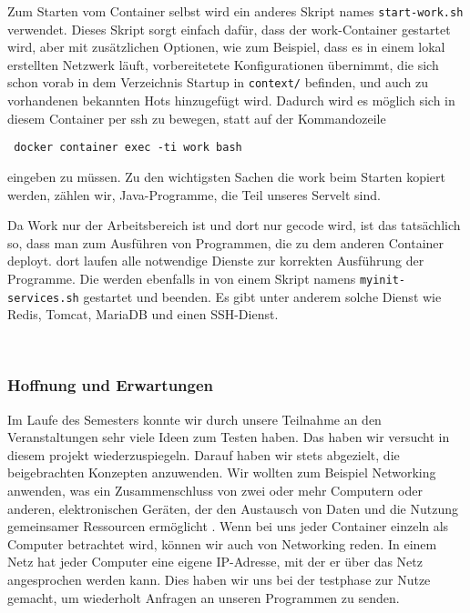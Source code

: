 Zum Starten vom Container selbst wird ein anderes Skript names \texttt{start-work.sh} verwendet. Dieses Skript sorgt einfach dafür, dass der work-Container gestartet wird, aber mit zusätzlichen Optionen, wie zum Beispiel, dass es in einem lokal erstellten Netzwerk läuft, vorbereitetete Konfigurationen übernimmt, die sich schon vorab in dem Verzeichnis Startup in \texttt{context/} befinden, und auch zu vorhandenen bekannten Hots hinzugefügt wird. Dadurch wird es möglich sich in diesem Container per ssh zu bewegen, statt auf der Kommandozeile \begin{verbatim} docker container exec -ti work bash \end{verbatim} eingeben zu müssen. Zu den wichtigsten Sachen die work beim Starten kopiert werden, zählen wir, Java-Programme, die Teil unseres Servelt sind.

Da Work nur der Arbeitsbereich ist und dort nur gecode wird, ist das tatsächlich so, dass man zum Ausführen von Programmen, die zu dem anderen Container deployt. dort laufen alle notwendige Dienste zur korrekten Ausführung der Programme. Die werden ebenfalls in von einem Skript namens \texttt{myinit-services.sh} gestartet und beenden. Es gibt unter anderem solche Dienst wie Redis, Tomcat, MariaDB und einen SSH-Dienst.

\\

\subsubsection{Hoffnung und Erwartungen}


Im Laufe des Semesters konnte wir durch unsere Teilnahme an den Veranstaltungen sehr viele Ideen zum Testen haben. Das haben wir versucht in diesem projekt wiederzuspiegeln. Darauf haben wir stets abgezielt, die beigebrachten Konzepten anzuwenden. Wir wollten zum Beispiel Networking anwenden, was ein Zusammenschluss von zwei oder mehr Computern oder anderen, elektronischen Geräten, der den Austausch von Daten und die Nutzung gemeinsamer Ressourcen ermöglicht \cite{ionos}. Wenn bei uns jeder Container einzeln als Computer betrachtet wird, können wir auch von Networking reden. In einem Netz hat jeder Computer eine eigene IP-Adresse, mit der er über das Netz angesprochen werden kann. Dies haben wir uns bei der testphase zur Nutze gemacht, um wiederholt Anfragen an unseren Programmen zu senden.

